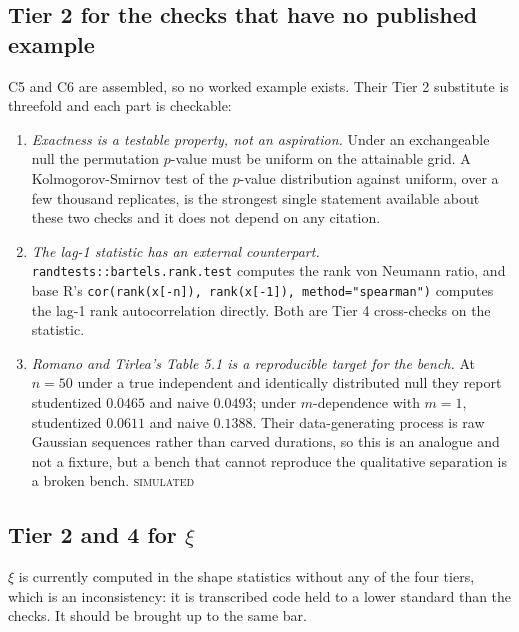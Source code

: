 \documentclass[11pt,a4paper]{article}
\newcommand{\SIMULATED}{\textsc{\textcolor{orange!70!black}{simulated}}}
\begin{document}
\subsection{Tier 2 for the checks that have no published example}

C5 and C6 are assembled, so no worked example exists. Their Tier 2 substitute is
threefold and each part is checkable:

\begin{enumerate}[leftmargin=1.6em,itemsep=2pt]
\item \emph{Exactness is a testable property, not an aspiration.} Under an exchangeable
null the permutation $p$-value must be uniform on the attainable grid. A
Kolmogorov-Smirnov test of the $p$-value distribution against uniform, over a few
thousand replicates, is the strongest single statement available about these two checks
and it does not depend on any citation.
\item \emph{The lag-1 statistic has an external counterpart.} \texttt{randtests::bartels.rank.test}
computes the rank von Neumann ratio, and base R's
\texttt{cor(rank(x[-n]), rank(x[-1]), method="spearman")} computes the lag-1 rank
autocorrelation directly. Both are Tier 4 cross-checks on the statistic.
\item \emph{Romano and Tirlea's Table 5.1 is a reproducible target for the bench.} At
$n=50$ under a true independent and identically distributed null they report studentized
$0.0465$ and naive $0.0493$; under $m$-dependence with $m=1$, studentized $0.0611$ and
naive $0.1388$. Their data-generating process is raw Gaussian sequences rather than
carved durations, so this is an analogue and not a fixture, but a bench that cannot
reproduce the qualitative separation is a broken bench. \SIMULATED
\end{enumerate}

\subsection{Tier 2 and 4 for \texorpdfstring{$\xi$}{xi}}

$\xi$ is currently computed in the shape statistics without any of the four tiers, which
is an inconsistency: it is transcribed code held to a lower standard than the checks. It
should be brought up to the same bar.
\end{document}
